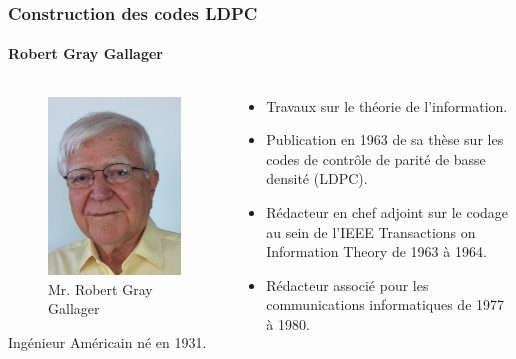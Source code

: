 \documentclass{beamer}
\begin{document}
    \begin{frame}
        \frametitle{Construction des codes LDPC}
        \framesubtitle{Robert Gray Gallager}
        \begin{columns}
            \begin{column}{5cm}
                \begin{figure}[!h]
                    \centering
                    \includegraphics[scale=0.2]{Robert_Gallager.jpg} 
                    \caption{Mr. Robert Gray Gallager} 
                    \label{fig:gallager}
                \end{figure}
                Ingénieur Américain né en 1931.
            \end{column}
            
            \begin{column}{5cm}
                \begin{itemize}
                    \item Travaux sur le théorie de l'information.
                    \item Publication en 1963 de sa thèse sur les codes de contrôle de parité de basse densité (LDPC).
                    \item Rédacteur en chef adjoint sur le codage au sein de l’IEEE Transactions on Information Theory de 1963 à 1964.
                    \item Rédacteur associé pour les communications informatiques de 1977 à 1980.
                \end{itemize}
            \end{column}
            \end{columns}
    \end{frame}
\end{document}
